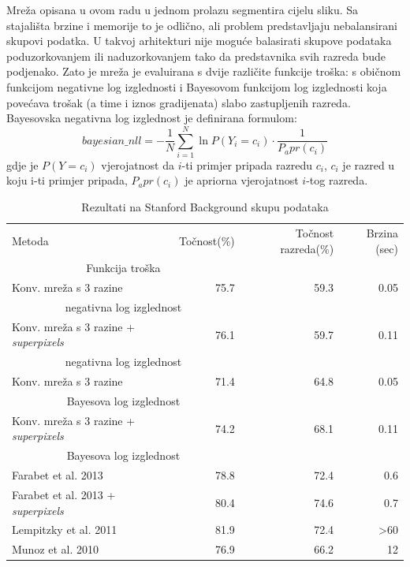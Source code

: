 \documentclass[times, utf8, diplomski, numeric]{fer}
\begin{document}
Mreža opisana u ovom radu u jednom prolazu segmentira cijelu sliku. Sa stajališta brzine i memorije to je odlično, ali problem predstavljaju nebalansirani skupovi podatka. U takvoj arhitekturi nije moguće balasirati skupove podataka poduzorkovanjem ili naduzorkovanjem tako da predstavnika svih razreda bude podjenako. Zato je mreža je evaluirana s dvije različite funkcije troška: s običnom funkcijom negativne log izglednosti i Bayesovom funkcijom log izglednosti\cite{daylac} koja povećava trošak (a time i iznos gradijenata) slabo zastupljenih razreda. Bayesovska negativna log izglednost je definirana formulom:
\begin{equation}
  bayesian\_nll = - \frac{1}{N} \sum_{i=1}^{N} \ln P(Y_i = c_i) \cdot \frac{1}{P_apr(c_i)}
\end{equation}
gdje je $P(Y = c_i)$ vjerojatnost da $i$-ti primjer pripada razredu $c_i$, $c_i$ je razred u koju i-ti primjer pripada, $P_apr(c_i)$ je apriorna vjerojatnost $i$-tog razreda.

\begin{table}
\centering
\begin{tabular}{l r r r}
  Metoda & Točnost(\%) & Točnost razreda(\%) & Brzina (sec) \\
    \multicolumn{2}{c}{Funkcija troška} & & \\[0.6em] \hline

  Konv. mreža s 3 razine & 75.7 & 59.3 & 0.05 \\
    \multicolumn{2}{c}{negativna log izglednost} & & \\ \hline
  Konv. mreža s 3 razine + \textit{superpixels} & 76.1 & 59.7 & 0.11 \\
    \multicolumn{2}{c}{negativna log izglednost} & & \\ \hline
  Konv. mreža s 3 razine & 71.4 & 64.8 & 0.05 \\
    \multicolumn{2}{c}{Bayesova log izglednost} & & \\ \hline
  Konv. mreža s 3 razine + \textit{superpixels} & 74.2 & 68.1 & 0.11 \\
    \multicolumn{2}{c}{Bayesova log izglednost} & & \\ \hline \hline
  Farabet et al.\cite{farabet_pami} 2013 & 78.8 & 72.4 & 0.6 \\ \hline
  Farabet et al.\cite{farabet_pami} 2013 + \textit{superpixels} & 80.4 & 74.6 & 0.7 \\ \hline
  Lempitzky et al.\cite{lempitsky11} 2011 & 81.9 & 72.4 & >60 \\ \hline
  Munoz et al.\cite{munoz10} 2010 & 76.9 & 66.2 & 12
\end{tabular}
\caption{Rezultati na Stanford Background skupu podataka}
\end{table}
\end{document}
